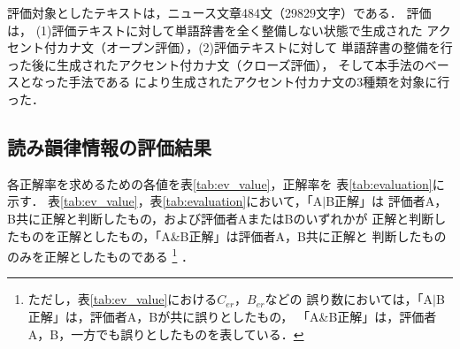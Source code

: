 評価対象としたテキストは，ニュース文章484文（29829文字）である．
評価は，
(1)評価テキストに対して単語辞書を全く整備しない状態で生成された
アクセント付カナ文（オープン評価），(2)評価テキストに対して
単語辞書の整備を行った後に生成されたアクセント付カナ文（クローズ評価），
そして本手法のベースとなった手法である
\cite{Miyazaki1}により生成されたアクセント付カナ文の3種類を対象に行った．

\subsection{読み韻律情報の評価結果}
各正解率を求めるための各値を表\ref{tab:ev_value}，正解率を
表\ref{tab:evaluation}に示す．
表\ref{tab:ev_value}，表\ref{tab:evaluation}において，「A$\mid$B正解」は
評価者A，B共に正解と判断したもの，および評価者AまたはBのいずれかが
正解と判断したものを正解としたもの，「A\&B正解」は評価者A，B共に正解と
判断したもののみを正解としたものである
\footnote{ただし，表\ref{tab:ev_value}における$C_{er}$，$B_{er}$などの
誤り数においては，「A$\mid$B正解」は，評価者A，Bが共に誤りとしたもの，
「A\&B正解」は，評価者A，B，一方でも誤りとしたものを表している．}
．

